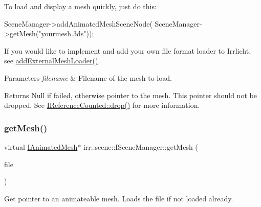 To load and display a mesh quickly, just do this\+: 
\begin{DoxyCode}
SceneManager->addAnimatedMeshSceneNode(
   SceneManager->getMesh(\textcolor{stringliteral}{"yourmesh.3ds"}));
\end{DoxyCode}
 If you would like to implement and add your own file format loader to Irrlicht, see \hyperlink{classirr_1_1scene_1_1ISceneManager_a808972cc001db86c0576c38b3b3fbbf7}{add\+External\+Mesh\+Loader()}. 
\begin{DoxyParams}{Parameters}
{\em filename} & Filename of the mesh to load. \\
\hline
\end{DoxyParams}
\begin{DoxyReturn}{Returns}
Null if failed, otherwise pointer to the mesh. This pointer should not be dropped. See \hyperlink{classirr_1_1IReferenceCounted_a03856a09355b89d178090c4a5f738543}{I\+Reference\+Counted\+::drop()} for more information. 
\end{DoxyReturn}
\mbox{\label{classirr_1_1scene_1_1ISceneManager_af0ff82d7bac969d6a30f67c7b1fa0c46}} 
\subsubsection{\texorpdfstring{get\+Mesh()}{getMesh()}\hspace{0.1cm}{\footnotesize\ttfamily [3/4]}}
{\footnotesize\ttfamily virtual \hyperlink{classirr_1_1scene_1_1IAnimatedMesh}{I\+Animated\+Mesh}$\ast$ irr\+::scene\+::\+I\+Scene\+Manager\+::get\+Mesh (\begin{DoxyParamCaption}\item[{\hyperlink{classirr_1_1io_1_1IReadFile}{io\+::\+I\+Read\+File} $\ast$}]{file }\end{DoxyParamCaption})\hspace{0.3cm}{\ttfamily [pure virtual]}}



Get pointer to an animateable mesh. Loads the file if not loaded already. 

